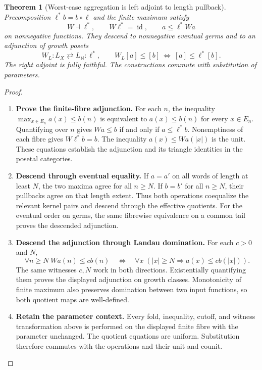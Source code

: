 \documentclass[11pt,a4paper]{article}
\numberwithin{algorithm}{section}
\numberwithin{equation}{section}
\newtheorem{theorem}{Theorem}[section]
\theoremstyle{definition}
\theoremstyle{remark}
\theoremstyle{plain}
\newcommand{\N}{\mathbb N}
\newcommand{\id}{\operatorname{id}}
\theoremstyle{definition}
\theoremstyle{plain}
\begin{document}
\begin{theorem}[Worst-case aggregation is left adjoint to length pullback]
\label{thm:wc-adjunction}
Precomposition $\ell^*b=b\circ\ell$ and the finite maximum satisfy
\[
 W\dashv\ell^*,\qquad W\ell^*=\id,
 \qquad a\le\ell^*Wa
\]
on nonnegative functions. They descend to nonnegative eventual germs
and to an adjunction of growth posets
\[
 W_L:L_X\rightleftarrows L_\N:\ell^*,
 \qquad
 W_L[a]\le[b]\ \Longleftrightarrow\ [a]\le\ell^*[b].
\]
The right adjoint is fully faithful. The constructions commute with
substitution of parameters.
\end{theorem}
\begin{proof}\leavevmode
\begin{enumerate}[leftmargin=*,align=left]
\item \textbf{Prove the finite-fibre adjunction.}
For each $n$, the inequality $\max_{x\in E_n}a(x)\le b(n)$ is
equivalent to $a(x)\le b(n)$ for every $x\in E_n$. Quantifying over
$n$ gives $Wa\le b$ if and only if $a\le\ell^*b$. Nonemptiness of
each fibre gives $W\ell^*b=b$. The inequality $a(x)\le Wa(|x|)$
is the unit. These equations establish the adjunction and its triangle
identities in the posetal categories.
\item \textbf{Descend through eventual equality.}
If $a=a'$ on all words of length at least $N$, the two maxima agree
for all $n\ge N$. If $b=b'$ for all $n\ge N$, their pullbacks agree
on that length extent. Thus both operations coequalize the relevant
kernel pairs and descend through the effective quotients. For the
eventual order on germs, the same fibrewise equivalence on a common
tail proves the descended adjunction.
\item \textbf{Descend the adjunction through Landau domination.}
For each $c>0$ and $N$,
\[
 \forall n\ge N\;Wa(n)\le c b(n)
 \quad\Longleftrightarrow\quad
 \forall x\;(|x|\ge N\Rightarrow a(x)\le c b(|x|)).
\]
The same witnesses $c,N$ work in both directions. Existentially
quantifying them proves the displayed adjunction on growth classes.
Monotonicity of finite maximum also preserves domination between two
input functions, so both quotient maps are well-defined.
\item \textbf{Retain the parameter context.}
Every fold, inequality, cutoff, and witness transformation above is
performed on the displayed finite fibre with the parameter unchanged.
The quotient equations are uniform. Substitution therefore commutes
with the operations and their unit and counit.
\end{enumerate}
\end{proof}
\end{document}
